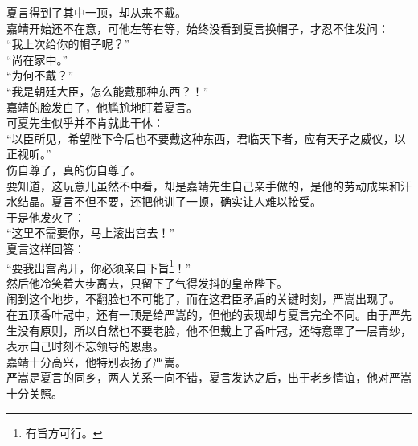 \begin{multicols}{\theparacolNo}
夏言得到了其中一顶，却从来不戴。\\

嘉靖开始还不在意，可他左等右等，始终没看到夏言换帽子，才忍不住发问：\\

“我上次给你的帽子呢？”\\

“尚在家中。”\\

“为何不戴？”\\

“我是朝廷大臣，怎么能戴那种东西？！”\\

嘉靖的脸发白了，他尴尬地盯着夏言。\\

可夏先生似乎并不肯就此干休：\\

“以臣所见，希望陛下今后也不要戴这种东西，君临天下者，应有天子之威仪，以正视听。”\\

伤自尊了，真的伤自尊了。\\

要知道，这玩意儿虽然不中看，却是嘉靖先生自己亲手做的，是他的劳动成果和汗水结晶。夏言不但不要，还把他训了一顿，确实让人难以接受。\\

于是他发火了：\\

“这里不需要你，马上滚出宫去！”\\

夏言这样回答：\\

“要我出宫离开，你必须亲自下旨\footnote{有旨方可行。}！”\\

然后他冷笑着大步离去，只留下了气得发抖的皇帝陛下。\\

闹到这个地步，不翻脸也不可能了，而在这君臣矛盾的关键时刻，严嵩出现了。\\

在五顶香叶冠中，还有一顶是给严嵩的，但他的表现却与夏言完全不同。由于严先生没有原则，所以自然也不要老脸，他不但戴上了香叶冠，还特意罩了一层青纱，表示自己时刻不忘领导的恩惠。\\

嘉靖十分高兴，他特别表扬了严嵩。\\

严嵩是夏言的同乡，两人关系一向不错，夏言发达之后，出于老乡情谊，他对严嵩十分关照。\\


\end{multicols}
